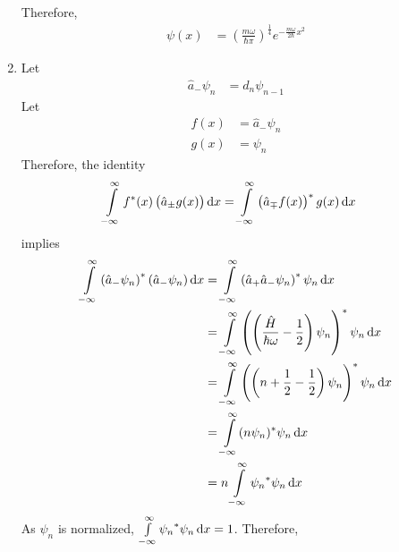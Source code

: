 \documentclass[fleqn, a4paper, 11pt, oneside]{amsart}
\theoremstyle{definition}
\theoremstyle{theorem}
\begin{document}
\begin{solution}
\begin{enumerate}[leftmargin=*]
			Therefore,
			\begin{align*}
				\psi(x) & = \left( \frac{m \omega}{\hbar \pi} \right)^{\frac{1}{4}} e^{-\frac{m \omega}{2 \hbar} x^2}
			\end{align*}
		\item
			Let
			\begin{align*}
				\hat{a}_- \psi_n & = d_n \psi_{n - 1}
			\end{align*}
			Let
			\begin{align*}
				f(x) & = \hat{a}_- \psi_n \\
				g(x) & = \psi_n
			\end{align*}
			Therefore, the identity
			\begin{align*}
				\int\limits_{-\infty}^{\infty} f^*(x) \left( \hat{a}_{\pm} g(x) \right) \dif x & = \int\limits_{-\infty}^{\infty} \left( \hat{a}_{\mp} f(x) \right)^* g(x) \dif x
			\end{align*}
			implies
			\begin{align*}
				\int\limits_{-\infty}^{\infty} \left( \hat{a}_- \psi_n \right)^* \left( \hat{a}_- \psi_n \right) \dif x & = \int\limits_{-\infty}^{\infty} \left( \hat{a}_+ \hat{a}_- \psi_n \right)^* \psi_n \dif x                                       \\
                                                                                                                                        & = \int\limits_{-\infty}^{\infty} \left( \left( \frac{\hat{H}}{\hbar \omega} - \frac{1}{2} \right) \psi_n \right)^* \psi_n \dif x \\
                                                                                                                                        & = \int\limits_{-\infty}^{\infty} \left( \left( n + \frac{1}{2} - \frac{1}{2} \right) \psi_n \right)^* \psi_n \dif x              \\
                                                                                                                                        & = \int\limits_{-\infty}^{\infty} (n \psi_n)^* \psi_n \dif x                                                                      \\
                                                                                                                                        & = n \int\limits_{-\infty}^{\infty} {\psi_n}^* \psi_n \dif x
			\end{align*}
			As $\psi_n$ is normalized, $\int\limits_{-\infty}^{\infty} {\psi_n}^* \psi_n \dif x = 1$.
			Therefore,

\end{enumerate}
\end{solution}
\end{document}
